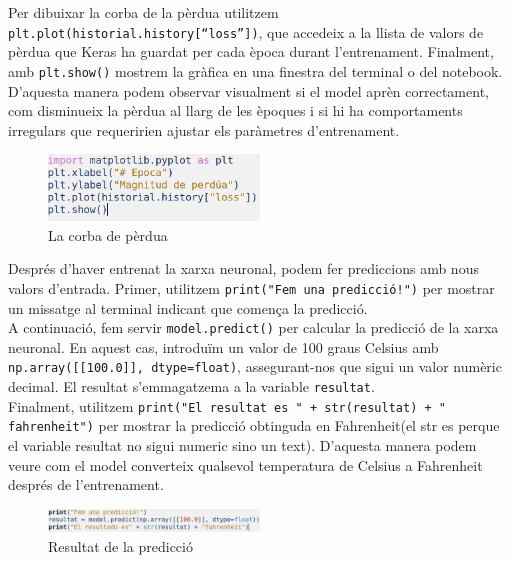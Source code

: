 Per dibuixar la corba de la pèrdua utilitzem \texttt{plt.plot(historial.history[``loss''])}, que accedeix a la llista de valors de pèrdua que Keras ha guardat per cada època durant l’entrenament. Finalment, amb \texttt{plt.show()} mostrem la gràfica en una finestra del terminal o del notebook.\\

D’aquesta manera podem observar visualment si el model aprèn correctament, com disminueix la pèrdua al llarg de les èpoques i si hi ha comportaments irregulars que requeririen ajustar els paràmetres d’entrenament.

\begin{figure}[H]
    \centering
    \includegraphics[width=0.5\textwidth]{./figures/7.png}
    \caption{La corba de pèrdua}
\end{figure}

Després d’haver entrenat la xarxa neuronal, podem fer prediccions amb nous valors d’entrada. Primer, utilitzem \texttt{print("Fem una predicció!")} per mostrar un missatge al terminal indicant que comença la predicció.\\

A continuació, fem servir \texttt{model.predict()} per calcular la predicció de la xarxa neuronal. En aquest cas, introduïm un valor de 100 graus Celsius amb \texttt{np.array([[100.0]], dtype=float)}, assegurant-nos que sigui un valor numèric decimal. El resultat s’emmagatzema a la variable \texttt{resultat}.\\

Finalment, utilitzem \texttt{print("El resultat es " + str(resultat) + " fahrenheit")} per mostrar la predicció obtinguda en Fahrenheit(el str es perque el variable resultat no sigui numeric sino un text). D’aquesta manera podem veure com el model converteix qualsevol temperatura de Celsius a Fahrenheit després de l’entrenament.


\begin{figure}[H]
    \centering
    \includegraphics[width=0.5\textwidth]{./figures/8.png}
    \caption{Resultat de la predicció}
\end{figure}

